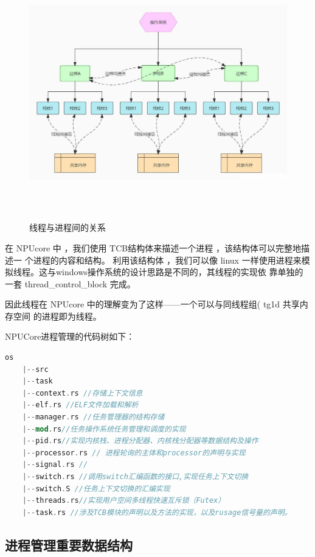 \begin{figure}[H]
	\centering
	\includegraphics[width=14cm,height=11cm]{figures/05-02-01-线程与进程间的关系.png}
	\caption{线程与进程间的关系}
\end{figure}  

在 NPUcore 中 ，我们使用 TCB结构体来描述一个进程 ，该结构体可以完整地描述一
个进程的内容和结构。 利用该结构体 ，我们可以像 linux
 一样使用进程来模拟线程。这与windows操作系统的设计思路是不同的，其线程的实现依
 靠单独的一套 thread\_control\_block 完成。
 
因此线程在 NPUcore 中的理解变为了这样——一个可以与同线程组( tg1d 共享内存空间
的进程即为线程。

NPUCore进程管理的代码树如下：
\begin{lstlisting}[language=Rust]
	os
	|--src
	|--task
	|--context.rs //存储上下文信息
	|--elf.rs //ELF文件加载和解析
	|--manager.rs //任务管理器的结构存储
	|--mod.rs//任务操作系统任务管理和调度的实现
	|--pid.rs//实现内核栈、进程分配器、内核栈分配器等数据结构及操作
	|--processor.rs // 进程轮询的主体和processor的声明与实现
	|--signal.rs //
	|--switch.rs //调用switch汇编函数的接口,实现任务上下文切换
	|--switch.S //任务上下文切换的汇编实现
	|--threads.rs//实现用户空间多线程快速互斥锁（Futex）
	|--task.rs //涉及TCB模块的声明以及方法的实现，以及rusage信号量的声明。
\end{lstlisting}

\subsection{进程管理重要数据结构}
